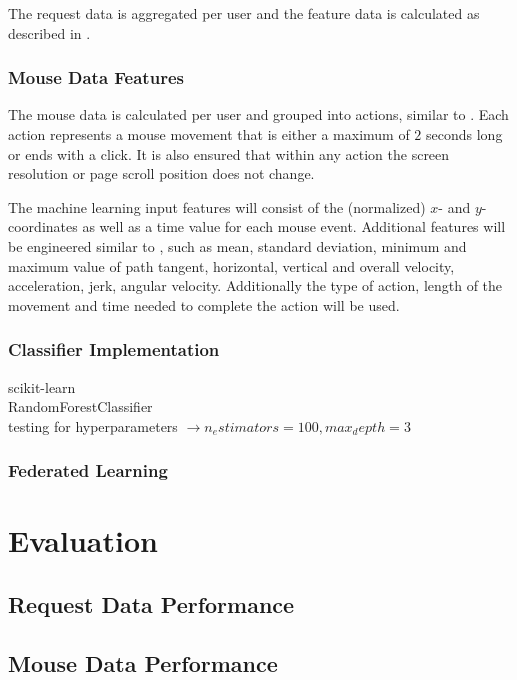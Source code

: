 \documentclass[
    fontsize=12pt,
    headings=small,
    parskip=half,           %
    bibliography=totoc,
    numbers=noenddot,       %
    open=any,               %
    final                   %
]{scrreprt}
\begin{document}
The request data is aggregated per user  and the feature data is calculated as described in .

\subsection{Mouse Data Features}

The mouse data is calculated per user and grouped into actions, similar to \cite{}. Each action represents a mouse movement that is either a maximum of $2$ seconds long or ends with a click. It is also ensured that within any action the screen resolution or page scroll position does not change.


The machine learning input features will consist of the (normalized) $x$- and $y$-coordinates as well as a time value for each mouse event. Additional features will be engineered similar to \cite{DBLP:journals/corr/abs-1810-04668}, such as mean, standard deviation, minimum and maximum value of path tangent, horizontal, vertical and overall velocity, acceleration, jerk, angular velocity. Additionally the type of action, length of the movement and time needed to complete the action will be used.
\todo

\subsection{Classifier Implementation}

scikit-learn \\
RandomForestClassifier \\
testing for hyperparameters $\rightarrow n_estimators=100, max_depth=3$ \\

\subsection{Federated Learning}


\chapter{Evaluation}

\section{Request Data Performance}

\section{Mouse Data Performance}
\end{document}
